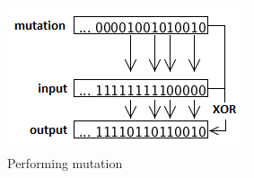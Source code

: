 \begin{figure}[H]
\includegraphics[width=\textwidth]{fpga/fig/mutation_perform.png}
\caption{Performing mutation}
\label{fig_mutation_perform}
\end{figure}